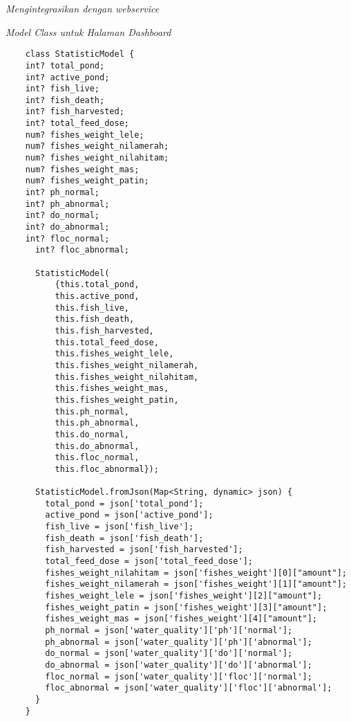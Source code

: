 	


\textit{Mengintegrasikan dengan webservice}

	\textit{Model Class untuk Halaman Dashboard}
	\begin{lstlisting}
	class StatisticModel {
  	int? total_pond;
  	int? active_pond;
  	int? fish_live;
  	int? fish_death;
  	int? fish_harvested;
  	int? total_feed_dose;
  	num? fishes_weight_lele;
  	num? fishes_weight_nilamerah;
  	num? fishes_weight_nilahitam;
  	num? fishes_weight_mas;
  	num? fishes_weight_patin;
  	int? ph_normal;
  	int? ph_abnormal;
  	int? do_normal;
  	int? do_abnormal;
  	int? floc_normal;
	  int? floc_abnormal;

	  StatisticModel(
	      {this.total_pond,
	      this.active_pond,
	      this.fish_live,
	      this.fish_death,
	      this.fish_harvested,
	      this.total_feed_dose,
	      this.fishes_weight_lele,
	      this.fishes_weight_nilamerah,
	      this.fishes_weight_nilahitam,
	      this.fishes_weight_mas,
	      this.fishes_weight_patin,
	      this.ph_normal,
	      this.ph_abnormal,
	      this.do_normal,
	      this.do_abnormal,
	      this.floc_normal,
	      this.floc_abnormal});

	  StatisticModel.fromJson(Map<String, dynamic> json) {
	    total_pond = json['total_pond'];
	    active_pond = json['active_pond'];
	    fish_live = json['fish_live'];
	    fish_death = json['fish_death'];
	    fish_harvested = json['fish_harvested'];
	    total_feed_dose = json['total_feed_dose'];
	    fishes_weight_nilahitam = json['fishes_weight'][0]["amount"];
	    fishes_weight_nilamerah = json['fishes_weight'][1]["amount"];
	    fishes_weight_lele = json['fishes_weight'][2]["amount"];
	    fishes_weight_patin = json['fishes_weight'][3]["amount"];
	    fishes_weight_mas = json['fishes_weight'][4]["amount"];
	    ph_normal = json['water_quality']['ph']['normal'];
	    ph_abnormal = json['water_quality']['ph']['abnormal'];
	    do_normal = json['water_quality']['do']['normal'];
	    do_abnormal = json['water_quality']['do']['abnormal'];
	    floc_normal = json['water_quality']['floc']['normal'];
	    floc_abnormal = json['water_quality']['floc']['abnormal'];
	  }
	}
	\end{lstlisting}

